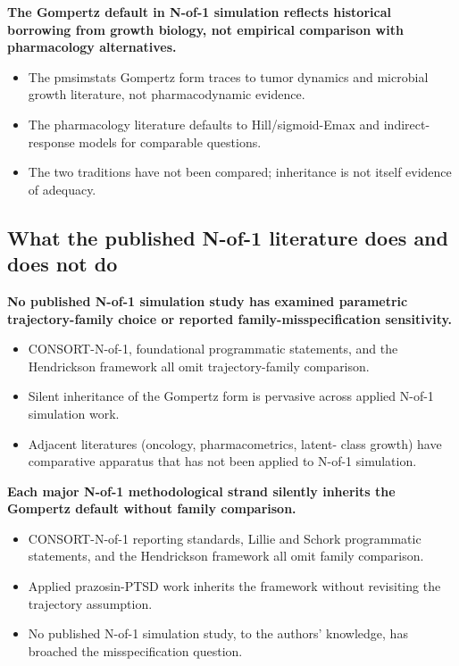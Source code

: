 \documentclass[
  11pt,
]{article}
\begin{document}
\textbf{The Gompertz default in N-of-1 simulation reflects
historical borrowing from growth biology, not empirical
comparison with pharmacology alternatives.}

\begin{itemize}\setlength{\itemsep}{2pt}\setlength{\parskip}{0pt}
\item The pmsimstats Gompertz form traces to tumor dynamics
  and microbial growth literature, not pharmacodynamic evidence.
\item The pharmacology literature defaults to Hill/sigmoid-Emax
  and indirect-response models for comparable questions.
\item The two traditions have not been compared; inheritance
  is not itself evidence of adequacy.
\end{itemize}

\subsection{What the published N-of-1 literature does and does not do}\label{what-the-published-n-of-1-literature-does-and-does-not-do}

\textbf{No published N-of-1 simulation study has examined
parametric trajectory-family choice or reported
family-misspecification sensitivity.}

\begin{itemize}\setlength{\itemsep}{2pt}\setlength{\parskip}{0pt}
\item CONSORT-N-of-1, foundational programmatic statements,
  and the Hendrickson framework all omit trajectory-family
  comparison.
\item Silent inheritance of the Gompertz form is pervasive
  across applied N-of-1 simulation work.
\item Adjacent literatures (oncology, pharmacometrics, latent-
  class growth) have comparative apparatus that has not been
  applied to N-of-1 simulation.
\end{itemize}

\textbf{Each major N-of-1 methodological strand silently
inherits the Gompertz default without family comparison.}

\begin{itemize}\setlength{\itemsep}{2pt}\setlength{\parskip}{0pt}
\item CONSORT-N-of-1 reporting standards, Lillie and Schork
  programmatic statements, and the Hendrickson framework all
  omit family comparison.
\item Applied prazosin-PTSD work inherits the framework without
  revisiting the trajectory assumption.
\item No published N-of-1 simulation study, to the authors'
  knowledge, has broached the misspecification question.
\end{itemize}
\end{document}
